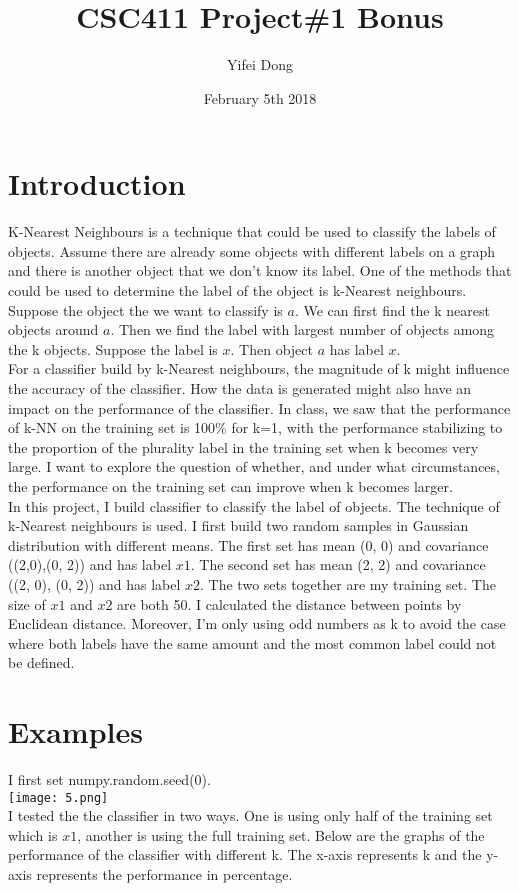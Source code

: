 \documentclass{article}
\title{CSC411 Project\#1 Bonus}
\author{Yifei Dong}
\date{February 5th 2018}
\begin{document}
\maketitle

\section{Introduction}
K-Nearest Neighbours is a technique that could be used to classify the labels of objects. Assume there are already some objects with different labels on a graph and there is another object that we don't know its label. One of the methods that could be used to determine the label of the object is k-Nearest neighbours. Suppose the object the we want to classify is $a$. We can first find the k nearest objects around $a$. Then we find the label with largest number of objects among the k objects. Suppose the label is $x$. Then object $a$ has label $x$.\\

\noindent
For a classifier build by k-Nearest neighbours, the magnitude of k might influence the accuracy of the classifier. How the data is generated might also have an impact on the performance of the classifier. In class, we saw that the performance of k-NN on the training set is 100\% for k=1, with the performance stabilizing to the proportion of the plurality label in the training set when k becomes very large. I want to explore the question of whether, and under what circumstances, the performance on the training set can improve when k becomes larger.\\

\noindent
In this project, I build classifier to classify the label of objects. The technique of k-Nearest neighbours is used. I first build two random samples in Gaussian distribution with different means. The first set has mean (0, 0) and covariance ((2,0),(0, 2)) and has label $x1$. The second set has mean (2, 2) and covariance ((2, 0), (0, 2)) and has label $x2$. The two sets together are my training set. The size of $x1$ and $x2$ are both 50. I calculated the distance between points by Euclidean distance. Moreover, I'm only using odd numbers as k to avoid the case where both labels have the same amount and the most common label could not be defined.\\


\section{Examples}
I first set numpy.random.seed(0). \\
\texttt{[image: 5.png]}\\
I tested the the classifier in two ways. One is using only half of the training set which is $x1$, another is using the full training set. Below are the graphs of the performance of the classifier with different k. The x-axis represents k and the y-axis represents the performance in percentage.\\
\end{document}
